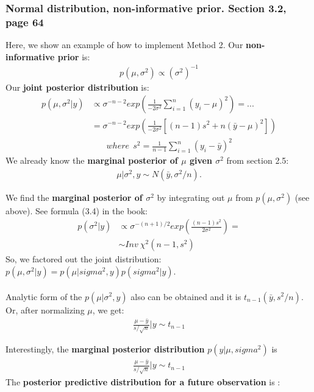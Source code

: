 \documentclass[]{article}
\begin{document}
\subsubsection{Normal distribution, non-informative prior. Section 3.2, page 64}
Here, we show an example of how to implement Method 2.
Our \textbf{non-informative prior} is:
$$
\begin{aligned}
	p(\mu, \sigma^2) \propto \left( \sigma^2 \right)^{-1}
\end{aligned}
$$
Our \textbf{joint posterior distribution} is:
$$
\begin{aligned}
	p(\mu, \sigma^2|y) &\propto  \sigma^{-n-2} exp\left(\frac{1}{  -2\sigma^2 }   \sum_{i=1}^n(y_i - \mu)^2 \right) =...\\
	                 & =  \sigma^{-n-2} exp\left(\frac{1}{  -2\sigma^2 }   \left[  (n-1)s^2 + n(\bar{y} - \mu)^2 \right] \right)\\
									 &~~~~~~~~where~~s^2 = \frac{1}{n-1}\sum_{i=1}^n(y_i - \bar{y})^2
\end{aligned}
$$
We already know the \textbf{marginal posterior of $\mu$ given $\sigma^2$} from section 2.5:
$$
\begin{aligned}
	\mu| \sigma^2,y \sim N\left(\bar{y}, \sigma^2/n \right).
\end{aligned}
$$

We find the \textbf{marginal posterior of $\sigma^2$} by integrating out $\mu$ from $p(\mu, \sigma^2)$ (see above). See formula (3.4) in the book:
$$
\begin{aligned}
	p(\sigma^2|y) &\propto  \sigma^{-(n+1)/2} exp\left(\frac{ (n-1)s^2}{  2\sigma^2 }  \right) =\\
	   & \sim Inv~\chi^2(n-1, s^2)
\end{aligned}
$$
So, we factored out the joint distribution: $p(\mu, \sigma^2|y) = p(\mu|sigma^2, y)p(sigma^2| y)$.\\
\\
Analytic form of the $p(\mu|\sigma^2,y)$ also can be obtained and it is $t_{n-1}(\bar{y}, s^2/n)$. Or, after normalizing $\mu$, we get:
$$
\begin{aligned}
	\frac{\mu - \bar{y}}{s/\sqrt{n}}|y\sim  t_{n-1}
\end{aligned}
$$

Interestingly, the \textbf{marginal posterior distribution} $p(y|\mu,sigma^2)$ is
$$
\begin{aligned}
	\frac{\mu - \bar{y}}{s/\sqrt{n}}|y\sim  t_{n-1}
\end{aligned}
$$
The \textbf{posterior predictive distribution for a future observation} is :
\end{document}
